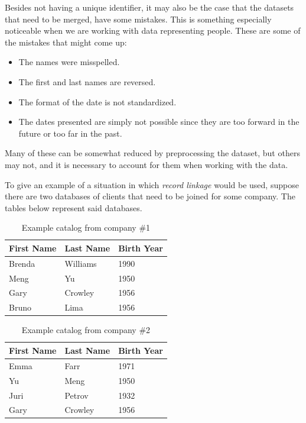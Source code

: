 \documentclass[epsfig,a4paper,11pt,titlepage,twoside,openany]{book}
\begin{document}
Besides not having a unique identifier, it may also be the case that the datasets that need to be merged, have some mistakes. This is something especially noticeable when we are working with data representing people. These are some of the mistakes that might come up: 

\begin{itemize}
\item The names were misspelled.
\item The first and last names are reversed.
\item The format of the date is not standardized.
\item The dates presented are simply not possible since they are too forward in the future or too far in the past.
\end{itemize}

Many of these can be somewhat reduced by preprocessing the dataset, but others may not, and it is necessary to account for them when working with the data.

To give an example of a situation in which \textit{record linkage} would be used,
suppose there are two databases of clients that need to be joined for some company. The tables below represent said databases.


\begin{table}[H]
  \centering{}
  \begin{tabular}{l|l|l}
    First Name & Last Name  & Birth Year \\ \hline
    Brenda     & Williams   & 1990       \\
    Meng        & Yu         & 1950       \\
    Gary        & Crowley   &  1956 \\
    Bruno      & Lima       & 1956      
  \end{tabular}
  \caption{Example catalog from company \#1}
  \label{tab:ex-catalog-1}
\end{table}


\begin{table}[H]
  \centering{}
  \begin{tabular}{l|l|l}
    First Name & Last Name  & Birth Year \\ \hline
    Emma       & Farr       & 1971       \\
    Yu         & Meng       & 1950       \\
    Juri       &  Petrov    & 1932 \\
    Gary       & Crowley    & 1956      
  \end{tabular}
  \caption{Example catalog from company \#2}
  \label{tab:ex-catalog-2}
\end{table}
\end{document}
